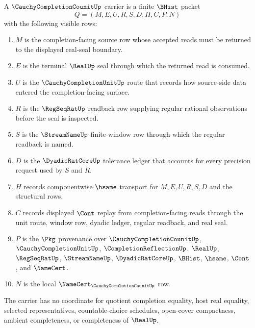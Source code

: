 \begin{definition}
\label{def:cauchy-completion-counit-carrier}
A $\CauchyCompletionCounitUp$ carrier is a finite $\BHist$ packet
$$
Q=(M,E,U,R,S,D,H,C,P,N)
$$
with the following visible rows:
\begin{enumerate}
\item $M$ is the completion-facing source row whose accepted reads must be returned to the displayed real-seal boundary.
\item $E$ is the terminal $\RealUp$ seal through which the returned read is consumed.
\item $U$ is the $\CauchyCompletionUnitUp$ route that records how source-side data entered the completion-facing surface.
\item $R$ is the $\RegSeqRatUp$ readback row supplying regular rational observations before the seal is inspected.
\item $S$ is the $\StreamNameUp$ finite-window row through which the regular readback is named.
\item $D$ is the $\DyadicRatCoreUp$ tolerance ledger that accounts for every precision request used by $S$ and $R$.
\item $H$ records componentwise $\hsame$ transport for $M,E,U,R,S,D$ and the structural rows.
\item $C$ records displayed $\Cont$ replay from completion-facing reads through the unit route, window row, dyadic ledger, regular readback, and real seal.
\item $P$ is the $\Pkg$ provenance over $\CauchyCompletionCounitUp$, $\CauchyCompletionUnitUp$, $\CompletionReflectionUp$, $\RealUp$, $\RegSeqRatUp$, $\StreamNameUp$, $\DyadicRatCoreUp$, $\BHist$, $\hsame$, $\Cont$, and $\NameCert$.
\item $N$ is the local $\NameCert_{\CauchyCompletionCounitUp}$ row.
\end{enumerate}
The carrier has no coordinate for quotient completion equality, host real equality, selected representatives, countable-choice schedules, open-cover compactness, ambient completeness, or completeness of $\RealUp$.
\end{definition}

